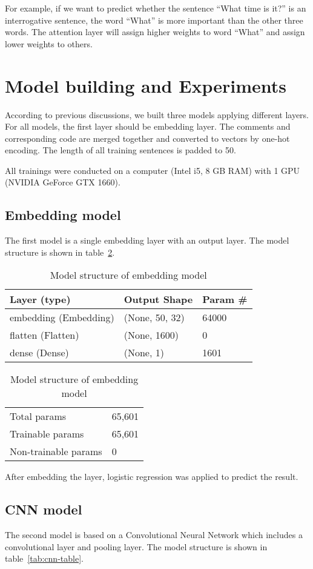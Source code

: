\documentclass[runningheads]{llncs}
\begin{document}
For example, if we want to predict whether the sentence ``What time is it?'' is an interrogative sentence, the word ``What'' is more important than the other three words. The attention layer will assign higher weights to word “What” and assign lower weights to others.


\section{Model building and Experiments}
According to previous discussions, we built three models applying different layers. For all models, the first layer should be embedding layer. The comments and corresponding code are merged together and converted to vectors by one-hot encoding. The length of all training sentences is padded to 50.

All trainings were conducted on a computer (Intel i5, 8 GB RAM) with 1 GPU (NVIDIA GeForce GTX 1660).

\subsection{Embedding model}
The first model is a single embedding layer with an output layer. The model structure is shown in table~\ref{tab:embedding-table}.

\begin{table}
\centering
\begin{tabular}{|l|l|l|}
\hline
\rowcolor[HTML]{C0C0C0} 
\textbf{Layer (type)} & \textbf{Output Shape} & \textbf{Param \#} \\ \hline
embedding (Embedding) & (None, 50, 32) & 64000 \\ \hline
flatten (Flatten) & (None, 1600) & 0 \\ \hline
dense (Dense) & (None, 1) & 1601 \\ \hline
\end{tabular}
\caption{Model structure of embedding model}
\label{tab:embedding-table}

\begin{tabular}{ll}
Total params & 65,601 \\
Trainable params & 65,601 \\
Non-trainable params & 0
\end{tabular}
\end{table}

After embedding the layer, logistic regression was applied to predict the result.

\subsection{CNN model}
The second model is based on a Convolutional Neural Network which includes a convolutional layer and pooling layer. The model structure is shown in table~\ref{tab:cnn-table}.
\end{document}
